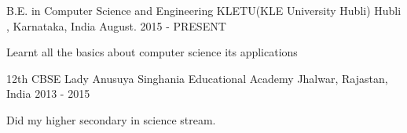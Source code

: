 


\begin{cventries}


\cventry
{B.E. in Computer Science and Engineering} %
{KLETU(KLE University Hubli)} %
{Hubli , Karnataka, India} %
{August. 2015 - PRESENT} %
{ %
\begin{cvitems}
\item {Learnt all the basics about computer science its applications}
\end{cvitems}
}


\end{cventries}

\begin{cventries}


\cventry
{12th CBSE} %
{Lady Anusuya Singhania Educational Academy} %
{Jhalwar, Rajastan, India} %
{2013 - 2015} %
{ %
\begin{cvitems}
\item {Did my higher secondary in science stream.}
\end{cvitems}
}


\end{cventries}